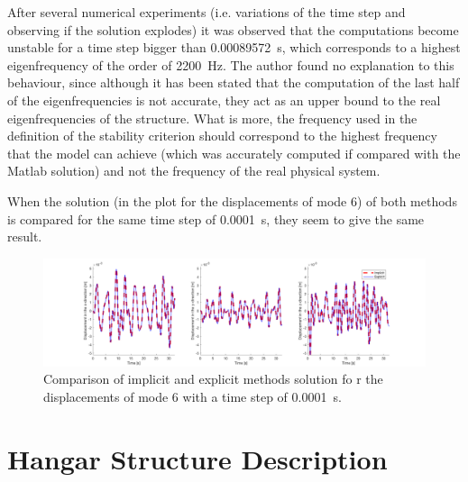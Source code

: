 \documentclass[AMdocument,optEnglish]{AMlatex}  %
\begin{document}
After several numerical experiments (i.e. variations of the time step and observing if the solution explodes) it was observed that the computations become unstable for a time step bigger than \SI{0.00089572}{\second}, which corresponds to a highest eigenfrequency of the order of \SI{2200}{\hertz}. The author found no explanation to this behaviour, since although it has been stated that the computation of the last half of the eigenfrequencies is not accurate, they act as an upper bound to the real eigenfrequencies of the structure. What is more, the frequency used in the definition of the stability criterion should correspond to the highest frequency that the model can achieve (which was accurately computed if compared with the Matlab solution) and not the frequency of the real physical system.
 
 When the solution (in the plot for the displacements of mode 6) of both methods is compared for the same time step of \SI{0.0001}{\second}, they seem to give the same result.
 
 \begin{figure}[ht] 
 	\centering
 	\includegraphics[width=\textwidth]{same} 
 	\caption{Comparison of implicit and explicit methods solution fo r the displacements of mode 6 with a time step of \SI{0.0001}{\second}.}
 	\label{fig:convergence}
 \end{figure}
 
\clearpage

\appendix

\section{Hangar Structure Description}
\label{sec:hangar-description}
\end{document}
